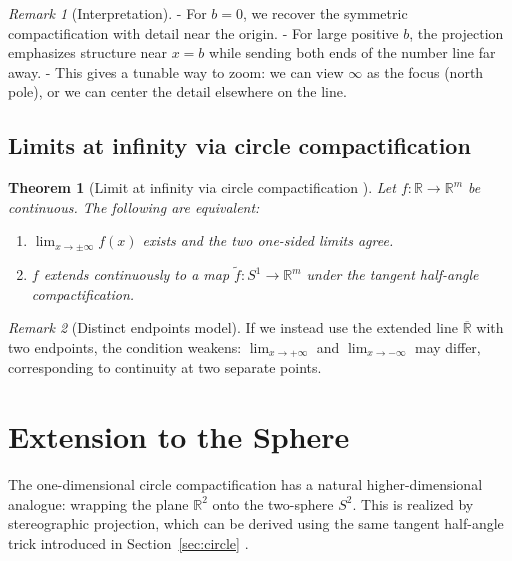 \documentclass[12pt]{article}
\newtheorem{theorem}{Theorem}
\theoremstyle{remark}
\newtheorem*{remark}{Remark}
\begin{document}
\begin{remark}[Interpretation]
- For $b=0$, we recover the symmetric compactification with detail near the origin.  
- For large positive $b$, the projection emphasizes structure near $x=b$ while 
sending both ends of the number line far away.  
- This gives a tunable way to zoom: we can view $\infty$ as the focus (north pole), 
or we can center the detail elsewhere on the line.  
\end{remark}

\subsection{Limits at infinity via circle compactification}
\begin{theorem}[Limit at infinity via circle compactification {\citep{RudinRealComplex}}]\label{thm:RtoS1}
Let $f:\mathbb{R}\to\mathbb{R}^m$ be continuous. The following are equivalent:
\begin{enumerate}
    \item $\lim_{x\to\pm\infty} f(x)$ exists and the two one-sided limits agree.  
    \item $f$ extends continuously to a map $\tilde f:S^1\to\mathbb{R}^m$ under 
    the tangent half-angle compactification.  
\end{enumerate}
\end{theorem}

\begin{remark}[Distinct endpoints model]
If we instead use the extended line $\overline{\mathbb{R}}$ with two endpoints, 
the condition weakens: $\lim_{x\to +\infty}$ and $\lim_{x\to -\infty}$ may differ, 
corresponding to continuity at two separate points.  
\end{remark}

\section{Extension to the Sphere}
\label{sec:sphere}

The one-dimensional circle compactification has a natural higher-dimensional 
analogue: wrapping the plane $\mathbb{R}^2$ onto the two-sphere $S^2$. 
This is realized by stereographic projection, which can be derived using 
the same tangent half-angle trick introduced in Section~\ref{sec:circle} 
\citep{Needham1997,AhlforsComplex}.
\end{document}
